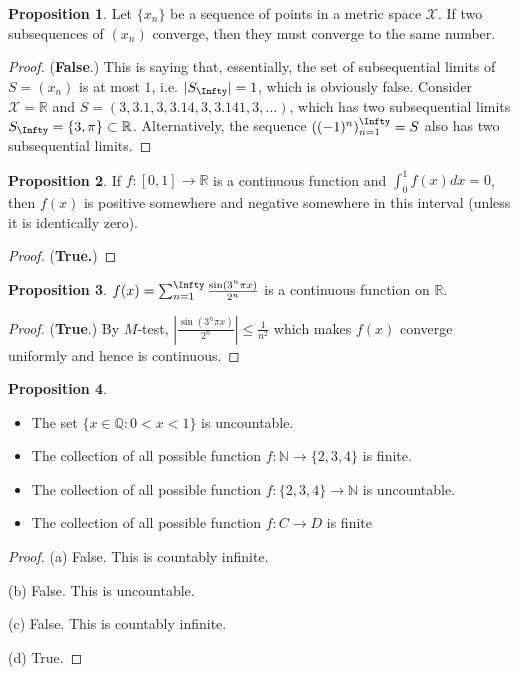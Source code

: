 \documentclass[oneside]{amsart}
\theoremstyle{definition}
\newtheorem{prop}{Proposition}[section]
\newcommand{\rr}{\mathbb R}
\newcommand{\nn}{\mathbb N}
\newcommand{\qq}{\mathbb Q}
\begin{document}
\begin{prop}
Let $\{x_n \}$ be a sequence of points in a metric space $\mathcal X$. If two subsequences of $(x_n)$ converge, then they must converge to the same number.	
\end{prop}
\begin{proof}
	(\textbf{False}.) This is saying that, essentially, the set of subsequential limits of $S=(x_n)$ is at most $1$, i.e. $|S_\Infty | = 1$, which is obviously false. Consider $\mathcal X = \rr$ and $S = (3, 3.1, 3, 3.14, 3, 3.141, 3, \ldots)$, which has two subsequential limits $S_\Infty = \{ 3, \pi \} \subset \rr$. Alternatively, the sequence $((-1)^n)_{n=1}^\Infty = S$ also has two subsequential limits. 
\end{proof}
\begin{prop}
If $f \colon [0,1] \to \rr$ is a continuous function and $\int_0^1 f(x) dx =0$, then $f(x)$ is positive somewhere and negative somewhere in this interval (unless it is identically zero).	
\end{prop}
\begin{proof}
(\textbf{True.}) 
\end{proof}
\begin{prop}
$f(x) = \sum_{n=1}^\Infty \frac{\sin (3^n \pi x)}{2^n}$ is a continuous function on $\rr$.	
\end{prop}
\begin{proof}
	(\textbf{True}.) By $M$-test, $\left |\frac{\sin (3^n \pi x)}{2^n} \right| \leq \frac{1}{n^2}$ which makes $f(x)$ converge uniformly and hence is continuous. 
\end{proof}

\begin{prop}\
\begin{itemize}
	\item [(a)] The set $\{ x \in \qq \colon 0 < x <1 \}$ is uncountable.
	\item [(b)] The collection of all possible function $f\colon \nn \to \{ 2,3,4 \}$ is finite.
	\item [(c)] The collection of all possible function $f\colon \{ 2,3,4 \} \to \nn $ is uncountable. 
	\item [(d)] The collection of all possible function $f\colon C \to D$ is finite
\end{itemize}	
\end{prop}

\begin{proof}
	(a) False. This is countably infinite.
	
	(b) False. This is uncountable.
	
	(c) False. This is countably infinite.
	
	(d) True.  
\end{proof}
\end{document}
